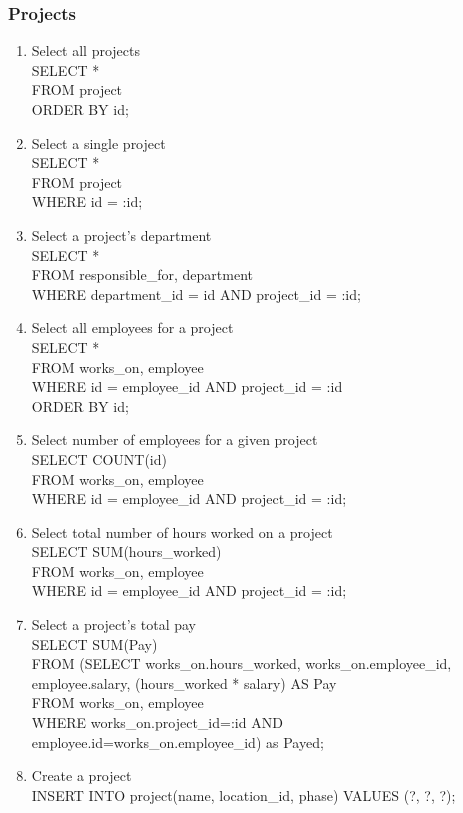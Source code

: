 \documentclass[11pt,letterpaper]{article}
\begin{document}
	\subsubsection{Projects}
	\begin{enumerate}
		\item Select all projects \\SELECT * \\FROM project \\ORDER BY id;
		\item Select a single project \\SELECT * \\FROM project \\WHERE id = :id;
		\item Select a project's department \\SELECT * \\FROM responsible\_for, department \\WHERE department\_id = id AND project\_id = :id;
		\item Select all employees for a project \\SELECT * \\FROM works\_on, employee \\WHERE id = employee\_id AND project\_id = :id \\ORDER BY id;
		\item Select number of employees for a given project \\SELECT COUNT(id) \\FROM works\_on, employee \\WHERE id = employee\_id AND project\_id = :id;
		\item Select total number of hours worked on a project \\SELECT SUM(hours\_worked) \\FROM works\_on, employee \\WHERE id = employee\_id AND project\_id = :id;
		\item Select a project's total pay \\SELECT SUM(Pay) \\FROM (SELECT works\_on.hours\_worked, works\_on.employee\_id, employee.salary, (hours\_worked * salary) AS Pay \\FROM works\_on, employee \\WHERE  works\_on.project\_id=:id AND employee.id=works\_on.employee\_id) as Payed; 
		\item Create a project \\INSERT INTO project(name, location\_id, phase) VALUES (?, ?, ?);

\end{enumerate}
\end{document}
